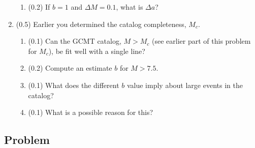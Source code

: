 \documentclass[11pt,titlepage,fleqn]{article}
\begin{document}
\begin{enumerate}
\begin{enumerate}
\item (0.2) If $b = 1$ and $\Delta M = 0.1$, what is $\Delta a$?

\end{enumerate}


\item (0.5) Earlier you determined the catalog completeness, $M_c$.
%
\begin{enumerate}
\item (0.1) Can the GCMT catalog, $M > M_c$ (see earlier part of this problem for $M_c$), be fit well with a single line?
\item (0.2) Compute an estimate $b$ for $M > 7.5$.
\item (0.1) What does the different $b$ value imply about large events in the catalog?
\item (0.1) What is a possible reason for this?
\end{enumerate}

\end{enumerate}


\pagebreak
\subsection*{Problem} \howmuchtime\



\iffalse
\begin{figure}[h]
\hspace{-1cm}
\texttt{[image: gcmt\_catalog.eps]}
\caption[]
{{
GCMT catalog.
\label{fig:gcmt}
}}
\end{figure}
\fi

\end{document}
